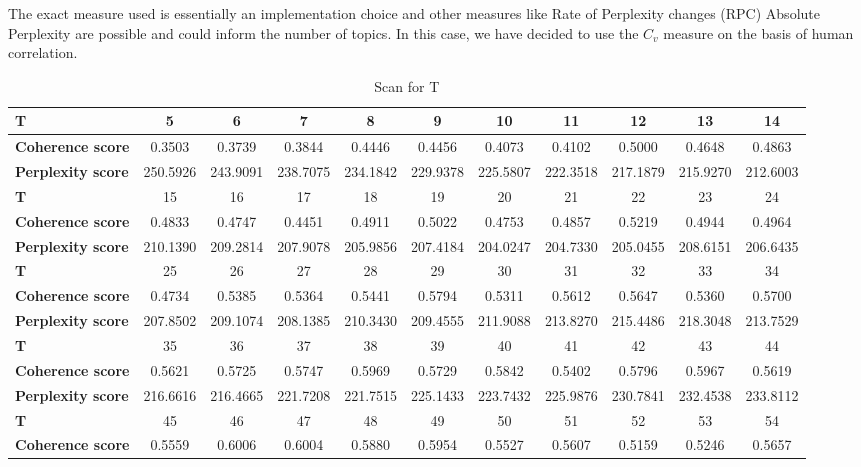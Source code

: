 \documentclass[12pt,journal,letterpaper,oneside,onecolumn]{IEEEtran}
\begin{document}
The exact measure used is essentially an implementation choice and other measures like Rate of Perplexity changes (RPC)  Absolute Perplexity are possible and could inform the number of topics. In this case, we have decided to use the $C_v$ measure on the basis of human correlation.

\begin{table}[h!]
\centering
\caption{Scan for T}\label{tabl_scan_for_t}
\begin{tabular}{l|c|c|c|c|c|c|c|c|c|c}
\hline
\textbf{T} & 5 & 6 & 7 & 8 & 9 & 10 & 11 & 12 & 13 & 14 \\ 
\hline
\textbf{Coherence score}  & 0.3503 & 0.3739 & 0.3844 & 0.4446 & 0.4456 & 0.4073 & 0.4102 & 0.5000 & 0.4648 & 0.4863 \\ 
\textbf{Perplexity score} & 250.5926 & 243.9091 & 238.7075 & 234.1842 & 229.9378 & 225.5807 & 222.3518 & 217.1879 & 215.9270 & 212.6003 \\ 
\hline
\textbf{T} & 15 & 16 & 17 & 18 & 19 & 20 & 21 & 22 & 23 & 24 \\ 
\hline
\textbf{Coherence score}  & 0.4833 & 0.4747 & 0.4451 & 0.4911 & 0.5022 & 0.4753 & 0.4857 & 0.5219 & 0.4944 & 0.4964 \\ 
\textbf{Perplexity score} & 210.1390 & 209.2814 & 207.9078 & 205.9856 & 207.4184 & 204.0247 & 204.7330 & 205.0455 & 208.6151 & 206.6435 \\ 
\hline
\textbf{T} & 25 & 26 & 27 & 28 & 29 & 30 & 31 & 32 & 33 & 34 \\ 
\hline
\textbf{Coherence score}  & 0.4734 & 0.5385 & 0.5364 & 0.5441 & 0.5794 & 0.5311 & 0.5612 & 0.5647 & 0.5360 & 0.5700 \\ 
\textbf{Perplexity score} & 207.8502 & 209.1074 & 208.1385 & 210.3430 & 209.4555 & 211.9088 & 213.8270 & 215.4486 & 218.3048 & 213.7529 \\ 
\hline
\textbf{T} & 35 & 36 & 37 & 38 & 39 & 40 & 41 & 42 & 43 & 44 \\ 
\hline
\textbf{Coherence score}  & 0.5621 & 0.5725 & 0.5747 & 0.5969 & 0.5729 & 0.5842 & 0.5402 & 0.5796 & 0.5967 & 0.5619 \\ 
\textbf{Perplexity score} & 216.6616 & 216.4665 & 221.7208 & 221.7515 & 225.1433 & 223.7432 & 225.9876 & 230.7841 & 232.4538 & 233.8112 \\ 
\hline
\textbf{T} & 45 & 46 & 47 & 48 & 49 & 50 & 51 & 52 & 53 & 54 \\ 
\hline
\textbf{Coherence score}  & 0.5559 & 0.6006 & 0.6004 & 0.5880 & 0.5954 & 0.5527 & 0.5607 & 0.5159 & 0.5246 & 0.5657 \\ 

\end{tabular}
\end{table}
\end{document}
